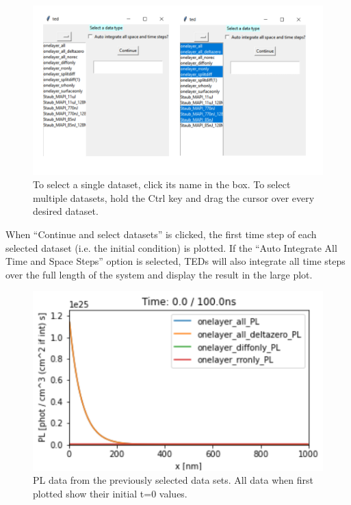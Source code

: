 \documentclass[11pt,letterpaper,titlepage]{article}
\begin{document}
		\begin{figure}[H]
			\label{fig:plotting_example}
			\centering
			\includegraphics[scale=1]{"plotting_example"}
			\caption{To select a single dataset, click its name in the box. 
			To select multiple datasets, hold the Ctrl key and drag the cursor over every desired dataset.
			}
		\end{figure}
	
		\par When “Continue and select datasets” is clicked, the first time step of each selected dataset (i.e. the initial condition) is plotted. If the “Auto Integrate All Time and Space Steps” option is selected, TEDs will also integrate all time steps over the full length of the system and display the result in the large plot.
		
		\begin{figure}[H]
			\label{fig:analyze_example}
			\centering
			\includegraphics[scale=1]{"analyze_example"}
			\caption{PL data from the previously selected data sets. All data when first plotted show their initial t=0 values.}
		\end{figure}
	
\end{document}

